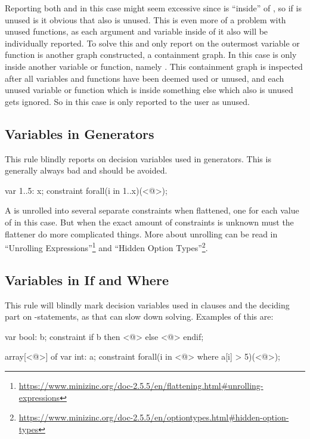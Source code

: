 \documentclass[a4paper,12pt]{article}
\newcommand{\mi}[1]{\mbox{\mzninline{#1}}}
\begin{document}
Reporting both \mi{J} and \mi{M} in this case might seem excessive since \mi{J} is
``inside'' of \mi{M}, so if \mi{M} is unused is it obvious that \mi{J} also is unused.
This is even more of a problem with unused functions, as each argument and variable inside
of it also will be individually reported. To solve this and only report on the outermost
variable or function is another graph constructed, a containment graph. In this case is
only \mi{J} inside another variable or function, namely \mi{M}. This containment graph is
inspected after all variables and functions have been deemed used or unused, and each
unused variable or function which is inside something else which also is unused gets
ignored. So in this case is only \mi{M} reported to the user as unused.

\subsection{Variables in Generators}\label{sec:rule:vargen}
This rule blindly reports on decision variables used in generators. This is generally
always bad and should be avoided.

\begin{mznnobreak}
var 1..5: x;
constraint forall(i in 1..x)(<@\dots@>);
\end{mznnobreak}

A \mi{forall} is unrolled into several separate constraints when flattened, one for each
value of \mi{i} in this case. But when the exact amount of constraints is unknown must the
flattener do more complicated things. More about unrolling can be read in ``Unrolling
Expressions''\footnote{\url{https://www.minizinc.org/doc-2.5.5/en/flattening.html\#unrolling-expressions}}
and ``Hidden Option Types''\footnote{\label{foot:hidden:opt}\url{https://www.minizinc.org/doc-2.5.5/en/optiontypes.html\#hidden-option-types}}.

\subsection{Variables in If and Where}\label{sec:rule:varif}
This rule will blindly mark decision variables used in \mi{where} clauses and the deciding
part on \mi{if}-statements, as that can slow down solving. Examples of this are:

\begin{mznnobreak}
var bool: b;
constraint if b then <@\dots@> else <@\dots@> endif;
\end{mznnobreak}
\begin{mznnobreak}
array[<@\dots@>] of var int: a;
constraint forall(i in <@\dots@> where a[i] > 5)(<@\dots@>);
\end{mznnobreak}
\end{document}
